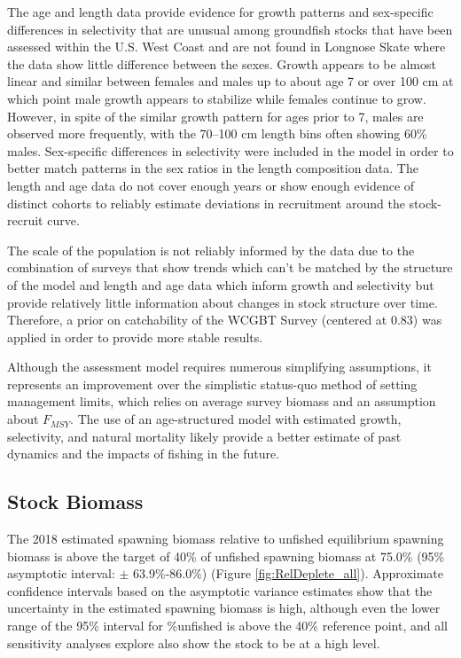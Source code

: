 \documentclass[12pt,]{article}
\begin{document}
The age and length data provide evidence for growth patterns and
sex-specific differences in selectivity that are unusual among
groundfish stocks that have been assessed within the U.S. West Coast and
are not found in Longnose Skate where the data show little difference
between the sexes. Growth appears to be almost linear and similar
between females and males up to about age 7 or over 100 cm at which
point male growth appears to stabilize while females continue to grow.
However, in spite of the similar growth pattern for ages prior to 7,
males are observed more frequently, with the 70--100 cm length bins
often showing 60\% males. Sex-specific differences in selectivity were
included in the model in order to better match patterns in the sex
ratios in the length composition data. The length and age data do not
cover enough years or show enough evidence of distinct cohorts to
reliably estimate deviations in recruitment around the stock-recruit
curve.

The scale of the population is not reliably informed by the data due to
the combination of surveys that show trends which can't be matched by
the structure of the model and length and age data which inform growth
and selectivity but provide relatively little information about changes
in stock structure over time. Therefore, a prior on catchability of the
WCGBT Survey (centered at 0.83) was applied in order to provide more
stable results.

Although the assessment model requires numerous simplifying assumptions,
it represents an improvement over the simplistic status-quo method of
setting management limits, which relies on average survey biomass and an
assumption about \(F_{MSY}\). The use of an age-structured model with
estimated growth, selectivity, and natural mortality likely provide a
better estimate of past dynamics and the impacts of fishing in the
future.

\hypertarget{stock-biomass}{%
\subsection*{Stock Biomass}\label{stock-biomass}}

The 2018 estimated spawning biomass relative to unfished equilibrium
spawning biomass is above the target of 40\% of unfished spawning
biomass at 75.0\% (95\% asymptotic interval: \(\pm\) 63.9\%-86.0\%)
(Figure \ref{fig:RelDeplete_all}). Approximate confidence intervals
based on the asymptotic variance estimates show that the uncertainty in
the estimated spawning biomass is high, although even the lower range of
the 95\% interval for \%unfished is above the 40\% reference point, and
all sensitivity analyses explore also show the stock to be at a high
level.
\end{document}
